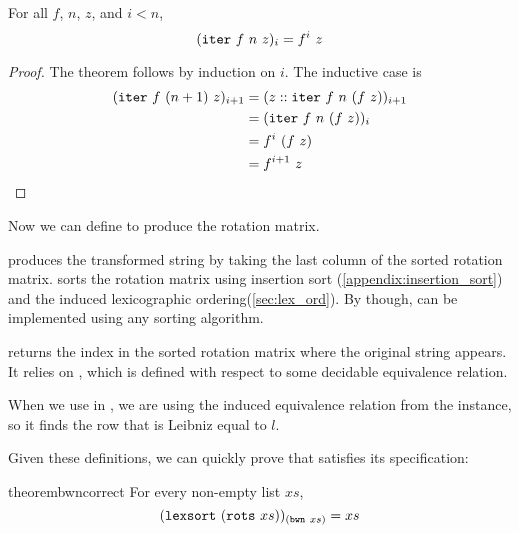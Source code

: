 \documentclass[sigplan,10pt,anonymous,review]{thesis}
\begin{document}
\begin{theorem}
  For all $f$, $n$, $z$, and $i < n$,
  \begin{equation*}
    (\texttt{iter}~f~n~z)_i = f^i~z
  \end{equation*}
\end{theorem}
\begin{proof}
  The theorem follows by induction on $i$. The inductive case is
  \begin{align*}
       (\texttt{iter}~f~(n+1)~z)_{i+1}
    &= (z :: \texttt{iter}~f~n~(f~z))_{i+1} \\
    &= (\texttt{iter}~f~n~(f~z))_i \\
    &= f^i~(f~z) \\
    &= f^{i+1}~z \qedhere
  \end{align*}
\end{proof}

Now we can define  to produce the rotation matrix.


 produces the transformed string by taking the last column of
the sorted rotation matrix.  sorts the rotation matrix
using insertion sort (\cref{appendix:insertion_sort}) and the induced
lexicographic ordering(\cref{sec:lex_ord}). By
 though,  can be implemented
using any sorting algorithm.


 returns the index in the sorted rotation matrix where the
original string appears. It relies on , which is
defined with respect to some decidable equivalence relation.


When we use  in , we are using the
induced equivalence relation from the  instance, so it
finds the row that is Leibniz equal to $l$.


Given these definitions, we can quickly prove that 
satisfies its specification:
\begin{restatable*}{theorem}{bwncorrect}
  For every non-empty list $xs$,
  \begin{equation*}
    (\texttt{lexsort}~(\texttt{rots}~xs))_{(\texttt{bwn}~xs)} = xs
  \end{equation*}
\end{restatable*}
\end{document}

